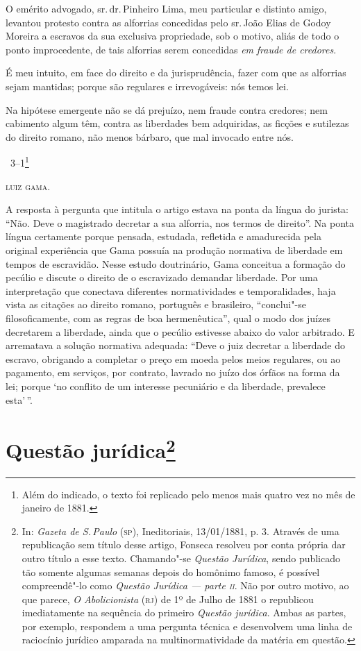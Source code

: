 O emérito advogado, sr.\,dr.\,Pinheiro Lima, meu particular e distinto
amigo, levantou protesto contra as alforrias concedidas pelo sr.\,João
Elias de Godoy Moreira a escravos da sua exclusiva propriedade, sob o
motivo, aliás de todo o ponto improcedente, de tais alforrias serem
concedidas \emph{em} \emph{fraude de credores}.

É meu intuito, em face do direito e da jurisprudência, fazer com que as
alforrias sejam mantidas; porque são regulares e irrevogáveis: nós temos
lei.

Na hipótese emergente não se dá prejuízo, nem fraude contra credores;
nem cabimento algum têm, contra as liberdades bem adquiridas, as ficções
e sutilezas do direito romano, não menos bárbaro, que mal invocado entre
nós.

\bigskip

\hfill\ 3--1\footnote{Além do indicado, o texto foi replicado pelo menos mais
  quatro vez no mês de janeiro de 1881.}
\medskip

\hfill\textsc{luiz gama.}

\pagebreak
\mbox{}\vfill
\thispagestyle{empty}

{\small\noindent
A resposta à pergunta que
intitula o artigo estava na ponta da língua do jurista: ``Não. Deve o
magistrado decretar a sua alforria, nos termos de direito''. Na ponta
língua certamente porque pensada, estudada, refletida e amadurecida pela
original experiência que Gama possuía na produção normativa de liberdade
em tempos de escravidão. Nesse estudo doutrinário, Gama conceitua a
formação do pecúlio e discute o direito de o escravizado demandar
liberdade. Por uma interpretação que conectava diferentes normatividades
e temporalidades, haja vista as citações ao direito romano, português e
brasileiro, ``conclui"-se filosoficamente, com as regras de boa
hermenêutica'', qual o modo dos juízes decretarem a
liberdade, ainda que o pecúlio estivesse abaixo do valor arbitrado. E
arrematava a solução normativa adequada: ``Deve o juiz decretar a
liberdade do escravo, obrigando a completar o preço em moeda pelos meios
regulares, ou ao pagamento, em serviços, por contrato, lavrado no juízo
dos órfãos na forma da lei; porque `no conflito de um interesse
pecuniário e da liberdade, prevalece esta'\,''. }

\chapter{Questão jurídica\footnote[*]{In: \emph{Gazeta de S.\,Paulo} (\textsc{sp}), Ineditoriais,
  13/01/1881, p. 3. Através de uma republicação sem título desse artigo,
  Fonseca resolveu por conta própria dar outro título a esse texto.
  Chamando"-se \emph{Questão Jurídica}, sendo
  publicado tão somente algumas semanas depois do homônimo famoso, é possível
  compreendê"-lo como \emph{Questão Jurídica --- parte \textsc{ii}}. Não por
  outro motivo, ao que parece, \emph{O Abolicionista} (\textsc{rj}) de 1º de
  Julho de 1881 o republicou imediatamente na sequência do primeiro
  \emph{Questão jurídica}. Ambas as partes, por exemplo, respondem a uma
  pergunta técnica e desenvolvem uma linha de raciocínio jurídico
  amparada na multinormatividade da matéria em questão.}}

